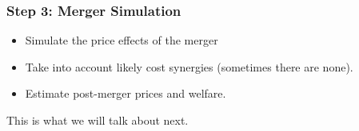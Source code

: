 \documentclass[xcolor=pdftex,dvipsnames,table,mathserif,aspectratio=169]{beamer}
\begin{document}
\begin{frame}
\frametitle{Step 3: Merger Simulation}
 \begin{itemize}
\item Simulate the price effects of the merger
\item Take into account likely cost synergies (sometimes there are none).
\item Estimate post-merger prices and welfare.
 \end{itemize}
 This is what we will talk about next.
\end{frame}
\end{document}
